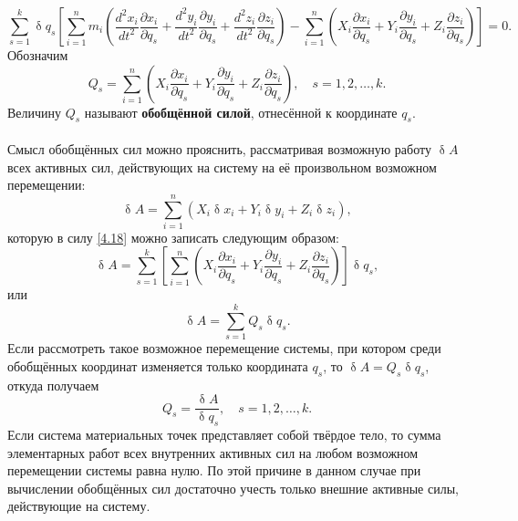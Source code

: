 \documentclass[a4paper, 12pt]{report}
\numberwithin{equation}{section}
\renewcommand{\delta}{\updelta}
\begin{document}
	\begin{equation}
		\label{4.19}
		\sum_{s=1}^k \delta q_s 
		\left[
		\sum_{i=1}^n m_i 
		\left(
		\frac{d^2 x_i}{dt^2} \frac{\partial x_i}{\partial q_s} + 
		\frac{d^2 y_i}{dt^2} \frac{\partial y_i}{\partial q_s} + 
		\frac{d^2 z_i}{dt^2} \frac{\partial z_i}{\partial q_s}
		\right) 
		- 
		\sum_{i=1}^n 
		\left(
		X_i \frac{\partial x_i}{\partial q_s} + 
		Y_i \frac{\partial y_i}{\partial q_s} + 
		Z_i \frac{\partial z_i}{\partial q_s}
		\right)
		\right] = 0.
	\end{equation}
	Обозначим
	\begin{equation}
		\label{4.20}
		Q_s = \sum_{i=1}^n 
		\left(
		X_i \frac{\partial x_i}{\partial q_s} + 
		Y_i \frac{\partial y_i}{\partial q_s} + 
		Z_i \frac{\partial z_i}{\partial q_s}
		\right), \quad s = 1, 2, \dots, k.
	\end{equation}
	Величину $Q_s$ называют \textbf{обобщённой силой}, отнесённой к координате $q_s$. 
	\\\\
	Смысл обобщённых сил можно прояснить, рассматривая возможную работу $\delta A$ всех активных сил, действующих на систему на её произвольном возможном перемещении:
	\begin{equation*}
		\delta A = \sum_{i=1}^n 
		\left(
		X_i \delta x_i + Y_i \delta y_i + Z_i \delta z_i
		\right),
	\end{equation*}
	которую в силу \eqref{4.18} можно записать следующим образом:
	\begin{equation*}
		\delta A = \sum_{s=1}^k 
		\left[
		\sum_{i=1}^n 
		\left(
		X_i \frac{\partial x_i}{\partial q_s} + 
		Y_i \frac{\partial y_i}{\partial q_s} + 
		Z_i \frac{\partial z_i}{\partial q_s}
		\right)
		\right] \delta q_s,
	\end{equation*}
	или
	\begin{equation*}
		\delta A = \sum_{s=1}^k Q_s \delta q_s.
	\end{equation*}
	Если рассмотреть такое возможное перемещение системы, при котором среди обобщённых координат изменяется только координата $q_s$, то $\delta A = Q_s \delta q_s$, откуда получаем
	\begin{equation*}
		Q_s = \frac{\delta A}{\delta q_s}, \quad s = 1, 2, \dots, k.
	\end{equation*}
	Если система материальных точек представляет собой твёрдое тело, то сумма элементарных работ всех внутренних активных сил на любом возможном перемещении системы равна нулю. По этой причине в данном случае при вычислении обобщённых сил достаточно учесть только внешние активные силы, действующие на систему.
\end{document}
